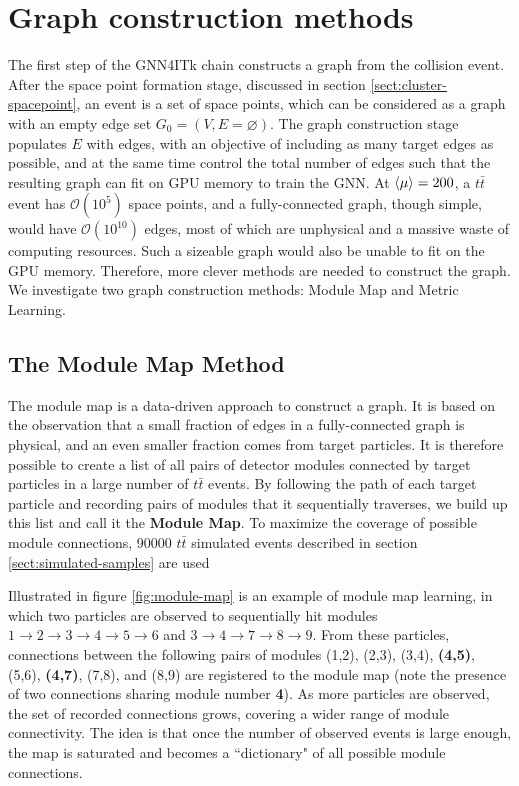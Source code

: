 \section{Graph construction methods}
\label{sect:graph-construction}
The first step of the GNN4ITk chain constructs a graph from the collision event. 
After the space point formation stage, discussed in section \ref{sect:cluster-spacepoint}, an event is a set of space points, which can be considered as a graph with an empty edge set $G_0=(V, E=\varnothing)$. 
The graph construction stage populates $E$ with edges, with an objective of including as many target edges as possible, and at the same time control the total number of edges such that the resulting graph can fit on GPU memory to train the GNN. 
At $\expval{\mu}=200$, a $t\bar{t}$ event has $\mathcal{O}(10^5)$ space points, and a fully-connected graph, though simple, would have $\mathcal{O}(10^{10})$ edges, most of which are unphysical and a massive waste of computing resources.
Such a sizeable graph would also be unable to fit on the GPU memory. 
Therefore, more clever methods are needed to construct the graph. 
We investigate two graph construction methods: Module Map and Metric Learning. 

\subsection{The Module Map Method}
\label{subsect:module-map}

The module map is a data-driven approach to construct a graph. 
It is based on the observation that a small fraction of edges in a fully-connected graph is physical, and an even smaller fraction comes from target particles.
It is therefore possible to create a list of all pairs of detector modules connected by target particles in a large number of $t\bar{t}$ events. 
By following the path of each target particle and recording pairs of modules that it sequentially traverses, we build up this list and call it the \textbf{Module Map}. 
To maximize the coverage of possible module connections, 90000 $t\bar{t}$ simulated events described in section \ref{sect:simulated-samples} are used

Illustrated in figure \ref{fig:module-map} is an example of module map learning, in which two particles are observed to sequentially hit modules $1\rightarrow2\rightarrow 3 \rightarrow 4 \rightarrow 5 \rightarrow 6$ and $3\rightarrow 4 \rightarrow 7 \rightarrow 8 \rightarrow 9$. 
From these particles, connections between the following pairs of modules (1,2), (2,3), (3,4), \textbf{(4,5)}, (5,6), \textbf{(4,7)}, (7,8), and (8,9) are registered to the module map (note the presence of two connections sharing module number \textbf{4}). 
As more particles are observed, the set of recorded connections grows, covering a wider range of module connectivity.
The idea is that once the number of observed events is large enough, the map is saturated and becomes a ``dictionary" of all possible module connections.

